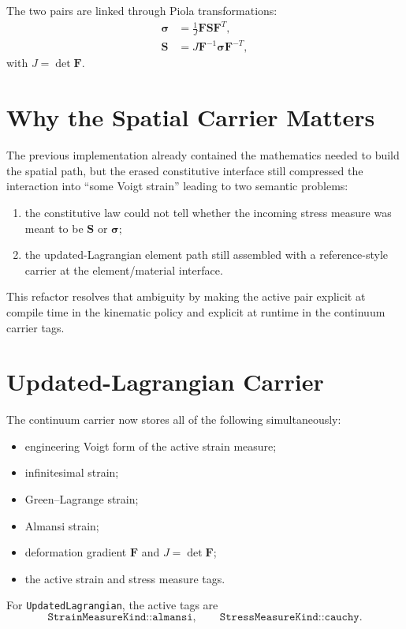 The two pairs are linked through Piola transformations:
\begin{align}
  \boldsymbol{\sigma} &= \frac{1}{J}\mathbf{F}\mathbf{S}\mathbf{F}^T, \\
  \mathbf{S} &= J\mathbf{F}^{-1}\boldsymbol{\sigma}\mathbf{F}^{-T},
\end{align}
with $J = \det \mathbf{F}$.

\section{Why the Spatial Carrier Matters}

The previous implementation already contained the mathematics needed to build
the spatial path, but the erased constitutive interface still compressed the
interaction into ``some Voigt strain'' leading to two semantic problems:
\begin{enumerate}
  \item the constitutive law could not tell whether the incoming stress measure
        was meant to be $\mathbf{S}$ or $\boldsymbol{\sigma}$;
  \item the updated-Lagrangian element path still assembled with a
        reference-style carrier at the element/material interface.
\end{enumerate}

This refactor resolves that ambiguity by making the active pair explicit at
compile time in the kinematic policy and explicit at runtime in the continuum
carrier tags.

\section{Updated-Lagrangian Carrier}

The continuum carrier now stores all of the following simultaneously:
\begin{itemize}
  \item engineering Voigt form of the active strain measure;
  \item infinitesimal strain;
  \item Green--Lagrange strain;
  \item Almansi strain;
  \item deformation gradient $\mathbf{F}$ and $J=\det\mathbf{F}$;
  \item the active strain and stress measure tags.
\end{itemize}

For \texttt{UpdatedLagrangian}, the active tags are
\[
  \texttt{StrainMeasureKind::almansi}, \qquad
  \texttt{StressMeasureKind::cauchy}.
\]


